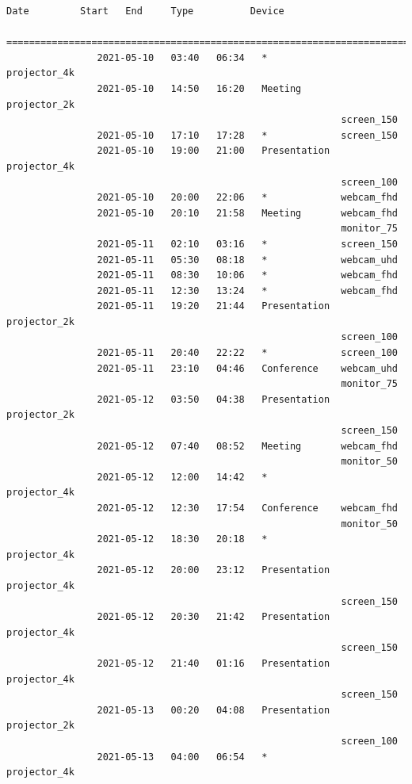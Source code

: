 \documentclass{article}
\begin{document}
\begin{Verbatim}[gobble=8]
                Date         Start   End     Type          Device
                ===========================================================================
                2021-05-10   03:40   06:34   *             projector_4k
                2021-05-10   14:50   16:20   Meeting       projector_2k
                                                           screen_150
                2021-05-10   17:10   17:28   *             screen_150
                2021-05-10   19:00   21:00   Presentation  projector_4k
                                                           screen_100
                2021-05-10   20:00   22:06   *             webcam_fhd
                2021-05-10   20:10   21:58   Meeting       webcam_fhd
                                                           monitor_75
                2021-05-11   02:10   03:16   *             screen_150
                2021-05-11   05:30   08:18   *             webcam_uhd
                2021-05-11   08:30   10:06   *             webcam_fhd
                2021-05-11   12:30   13:24   *             webcam_fhd
                2021-05-11   19:20   21:44   Presentation  projector_2k
                                                           screen_100
                2021-05-11   20:40   22:22   *             screen_100
                2021-05-11   23:10   04:46   Conference    webcam_uhd
                                                           monitor_75
                2021-05-12   03:50   04:38   Presentation  projector_2k
                                                           screen_150
                2021-05-12   07:40   08:52   Meeting       webcam_fhd
                                                           monitor_50
                2021-05-12   12:00   14:42   *             projector_4k
                2021-05-12   12:30   17:54   Conference    webcam_fhd
                                                           monitor_50
                2021-05-12   18:30   20:18   *             projector_4k
                2021-05-12   20:00   23:12   Presentation  projector_4k
                                                           screen_150
                2021-05-12   20:30   21:42   Presentation  projector_4k
                                                           screen_150
                2021-05-12   21:40   01:16   Presentation  projector_4k
                                                           screen_150
                2021-05-13   00:20   04:08   Presentation  projector_2k
                                                           screen_100
                2021-05-13   04:00   06:54   *             projector_4k

\end{Verbatim}
\end{document}
